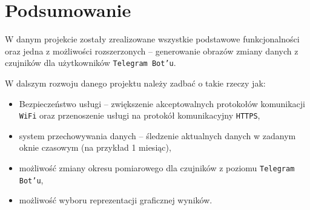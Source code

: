 \section{Podsumowanie}
W danym projekcie zostały zrealizowane wszystkie podstawowe 
funkcjonalności oraz jedna z możliwości rozszerzonych -- generowanie obrazów
zmiany danych z czujników dla użytkowników \texttt{Telegram Bot'u}.

W dalszym rozwoju danego projektu należy zadbać o takie rzeczy jak:
\begin{itemize}
  \item Bezpieczeństwo usługi -- zwiększenie akceptowalnych protokołów komunikacji \texttt{WiFi}
    oraz przenoszenie usługi na protokół komunikacyjny \texttt{HTTPS},
  \item system przechowywania danych -- śledzenie aktualnych danych w zadanym oknie czasowym
    (na przykład 1 miesiąc),
  \item możliwość zmiany okresu pomiarowego dla czujników z poziomu \texttt{Telegram Bot'u},
  \item możliwość wyboru reprezentacji graficznej wyników.
\end{itemize}

